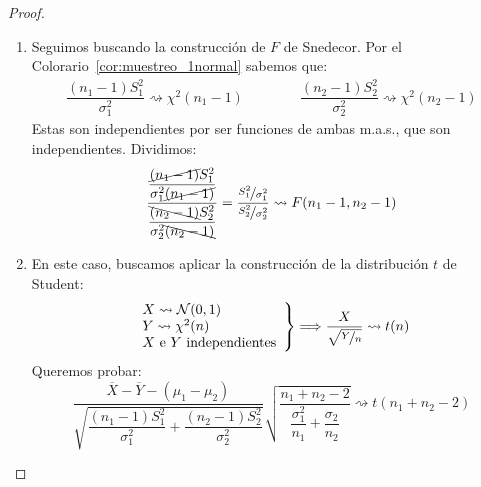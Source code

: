 \begin{coro}
\begin{proof}
\begin{enumerate}
            Como las m.a.s. son independientes y ambas distribuciones $\chi^2$ son funciones de las m.a.s., tenemos que ambas variables son independientes. Por tanto, podemos aplicar la construcción de la distribución $F$ de Snedecor:
            \begin{equation*}
                \dfrac{\frac{\sum\limits_{i=1}^{n_1}{(X_i-\mu_1)}^{2}}{n_1\sigma_1^2}}{\frac{\sum\limits_{i=1}^{n_2}{(Y_i - \mu_2)}^{2}}{n_2\sigma_2^2}} = \dfrac{n_2}{n_1}\dfrac{\sigma_2^2}{\sigma_1^2} \dfrac{\sum\limits_{i=1}^{n_1}{(X_i-\mu_1)}^{2}}{\sum\limits_{i=1}^{n_2}{(Y_i - \mu_2)}^{2}} \rightsquigarrow F(n_1,n_2)
            \end{equation*}

        \item Seguimos buscando la construcción de $F$ de Snedecor. Por el Colorario~\ref{cor:muestreo_1normal} sabemos que:
            \begin{align*}
                \dfrac{(n_1-1)S_1^2}{\sigma_1^2} \rightsquigarrow\chi^2(n_1-1) \qquad \qquad
                \dfrac{(n_2-1)S_2^2}{\sigma_2^2} \rightsquigarrow\chi^2(n_2-1)
            \end{align*}
            Estas son independientes por ser funciones de ambas m.a.s., que son independientes. Dividimos:
            \begin{equation*}
                \dfrac{\dfrac{\cancel{(n_1-1)}S_1^2}{\sigma_1^2\cancel{(n_1-1)}}}{\dfrac{\bcancel{(n_2-1)}S_2^2}{\sigma_2^2\bcancel{(n_2-1)}}} = \dfrac{\nicefrac{S_1^2}{\sigma_1^2}}{\nicefrac{S_2^2}{\sigma_2^2}} \rightsquigarrow F(n_1-1,n_2-1)
            \end{equation*}
        \item En este caso, buscamos aplicar la construcción de la distribución $t$ de Student:
            \begin{equation*}
                \left.\begin{array}{l}
                        X \rightsquigarrow \mathcal{N}(0,1) \\
                        Y\rightsquigarrow\chi^2(n)\\
                        \text{$X$ e $Y$ independientes}
                \end{array}\right\} \Longrightarrow \dfrac{X}{\sqrt{\nicefrac{Y}{n}}} \rightsquigarrow t(n)
            \end{equation*}
            Queremos probar:
            \begin{equation*}
                \dfrac{\overline{X}-\overline{Y}-(\mu_1-\mu_2)}{\sqrt{\dfrac{(n_1-1)S_1^2}{\sigma_1^2} + \dfrac{(n_2-1)S_2^2}{\sigma_2^2}}} \sqrt{\dfrac{n_1+n_2-2}{\dfrac{\sigma_1^2}{n_1}+\dfrac{\sigma_2}{n_2}}} \rightsquigarrow t(n_1+n_2-2)
            \end{equation*}
            

\end{enumerate}
\end{proof}
\end{coro}
